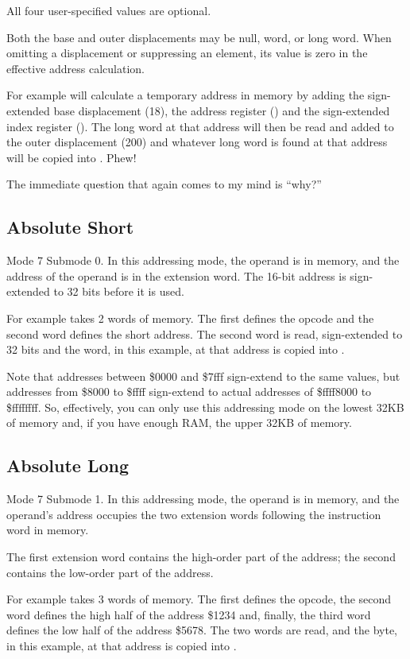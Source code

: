 All four user-specified values are optional. 

Both the base and outer displacements may be null, word, or long word. When omitting a displacement or suppressing an element, its value is zero in the effective address calculation.

For example  will calculate a temporary address in memory by adding the sign-extended base displacement (18), the address register () and the sign-extended index register (). The long word at that address will then be read and added to the outer displacement (200) and whatever long word is found at that address will be copied into . Phew!

The immediate question that again comes to my mind is ``why?''

\subsection{Absolute Short}
Mode 7 Submode 0. In this addressing mode, the operand is in memory, and the address of the operand is in the extension word. The 16-bit address is sign-extended to 32 bits before it is used.

For example  takes 2 words of memory. The first defines the opcode and the second word defines the short address. The second word is read, sign-extended to 32 bits and the word, in this example, at that address is copied into .

Note that addresses between \$0000 and \$7fff sign-extend to the same values, but addresses from \$8000 to \$ffff sign-extend to actual addresses of \$ffff8000 to \$ffffffff. So, effectively, you can only use this addressing mode on the lowest 32KB of memory and, if you have enough RAM, the upper 32KB of memory.

\subsection{Absolute Long}
Mode 7 Submode 1. In this addressing mode, the operand is in memory, and the operand’s address occupies the two extension words following the instruction word in memory. 

The first extension word contains the high-order part of the address; the second contains the low-order part of the address.

For example  takes 3 words of memory. The first defines the opcode, the second word defines the high half of the address \$1234 and, finally, the third word defines the low half of the address \$5678. The two words are read, and the byte, in this example, at that address is copied into .

